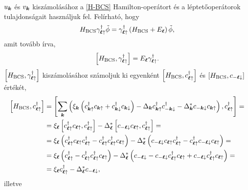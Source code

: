\documentclass[a4paper,12pt,titlepage]{article}
\newcommand{\KK}{{\vb*{k}}}
\newcommand{\LL}{{\vb*{\ell}}}
\begin{document}
$u_\KK$ és $v_\KK$ kiszámolásához a \eqref{H-BCS} Hamilton-operátort és a léptetőoperátorok tulajdonságait használjuk fel.  Felírható, hogy
\begin{equation}
	H_\text{BCS} \gamma_{\LL \uparrow}^\dagger \tilde{\phi} = \gamma_{\LL \uparrow}^\dagger \left( H_\text{BCS} + E_\LL \right) \tilde{\phi},
\end{equation}
amit tovább írva,
\begin{equation}
	\left[ H_\text{BCS}, \gamma_{\LL \uparrow}^\dagger \right] = E_\LL \gamma_{\LL \uparrow}^\dagger.
\end{equation}
$\left[ H_\text{BCS}, \gamma_{\LL \uparrow}^\dagger \right]$ kiszámolásához számoljuk ki egyenként $\left[ H_\text{BCS}, c_{\LL \uparrow}^\dagger \right]$ és $\left[ H_\text{BCS}, c_{-\LL \downarrow} \right]$ értékét,
\begin{equation}
\begin{split}
	\left[ H_\text{BCS}, c_{\LL \uparrow}^\dagger \right] & = \left[ \sum\limits_\KK \left(\xi_\KK \left( c_{\KK \uparrow}^\dagger c_{\KK \uparrow} + c_{\KK \downarrow}^\dagger c_{\KK \downarrow} \right) - \Delta_\KK c_{\KK \uparrow}^\dagger c_{-\KK \downarrow}^\dagger - \Delta_\KK^* c_{-\KK \downarrow} c_{\KK \uparrow} \right), c_{\LL \uparrow}^\dagger \right] = \\
	& = \xi_\LL \left[ c_{\LL \uparrow}^\dagger c_{\LL \uparrow}, c_{\LL \uparrow}^\dagger \right] - \Delta_\LL^* \left[ c_{-\LL \downarrow} c_{\LL \uparrow}, c_{\LL \uparrow}^\dagger \right] = \\
	& = \xi_\LL \left( c_{\LL \uparrow}^\dagger c_{\LL \uparrow} c_{\LL \uparrow}^\dagger - c_{\LL \uparrow}^\dagger c_{\LL \uparrow}^\dagger c_{\LL \uparrow} \right) - \Delta_\LL^* \left( c_{-\LL \downarrow} c_{\LL \uparrow} c_{\LL \uparrow}^\dagger - c_{\LL \uparrow}^\dagger c_{-\LL \downarrow} c_{\LL \uparrow} \right) = \\
	& = \xi_\LL \left( c_{\LL \uparrow}^\dagger - c_{\LL \uparrow}^\dagger c_{\LL \uparrow}^\dagger c_{\LL \uparrow} \right) - \Delta_\LL^* \left( c_{-\LL \downarrow} - c_{-\LL \downarrow} c_{\LL \uparrow}^\dagger c_{\LL \uparrow} + c_{-\LL \downarrow} c_{\LL \uparrow}^\dagger c_{\LL \uparrow} \right) = \\
	& = \xi_\LL c_{\LL \uparrow}^\dagger - \Delta_\LL^* c_{-\LL \downarrow},
\end{split}
\end{equation}
illetve
\end{document}
